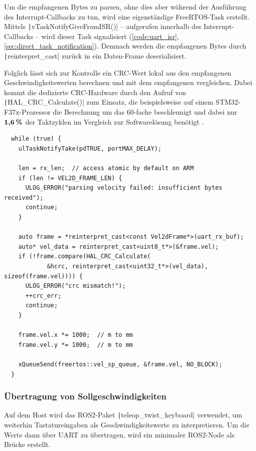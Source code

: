 Um die empfangenen Bytes zu parsen, ohne dies aber während der Ausführung des
Interrupt-Callbacks zu tun, wird eine eigenständige FreeRTOS-Task erstellt.
Mittels \texttt|vTaskNotifyGiveFromISR()| -- aufgerufen innerhalb des
Interrupt-Callbacks -- wird dieser Task signalisiert (\ref{code:uart_isr},
\ref{sec:direct_task_notification}). Demnach werden die empfangenen Bytes durch
\texttt|reinterpret_cast| zurück in ein Daten-Frame deserialisiert.

Folglich lässt sich zur Kontrolle ein CRC-Wert lokal aus den empfangenen
Geschwindigkeitswerten berechnen und mit dem empfangenen vergleichen. Dabei
kommt die dedizierte CRC-Hardware durch den Aufruf von
\texttt|HAL_CRC_Calculate()| zum Einsatz, die beispielsweise auf einem
STM32-F37x-Prozessor die Berechnung um das 60-fache beschleunigt und dabei nur
$\textbf{1,6\,\%}$ der Taktzyklen im Vergleich zur Softwarelösung benötigt
\cite[S. 9]{AN4187}.

\begin{code}
\begin{verbatim}
  while (true) {
    ulTaskNotifyTake(pdTRUE, portMAX_DELAY);

    len = rx_len;  // access atomic by default on ARM
    if (len != VEL2D_FRAME_LEN) {
      ULOG_ERROR("parsing velocity failed: insufficient bytes received");
      continue;
    }

    auto frame = *reinterpret_cast<const Vel2dFrame*>(uart_rx_buf);
    auto* vel_data = reinterpret_cast<uint8_t*>(&frame.vel);
    if (!frame.compare(HAL_CRC_Calculate(
            &hcrc, reinterpret_cast<uint32_t*>(vel_data), sizeof(frame.vel)))) {
      ULOG_ERROR("crc mismatch!");
      ++crc_err;
      continue;
    }

    frame.vel.x *= 1000;  // m to mm
    frame.vel.y *= 1000;  // m to mm

    xQueueSend(freertos::vel_sp_queue, &frame.vel, NO_BLOCK);
  }
\end{verbatim}
\end{code}

\subsubsection{Übertragung von Sollgeschwindigkeiten}

Auf dem Host wird das ROS2-Paket \texttt|teleop_twist_keyboard|
verwendet, um weiterhin Tastatureingaben als Geschwindigkeitswerte zu
interpretieren. Um die Werte dann über UART zu übertragen, wird ein minimaler
ROS2-Node als Brücke erstellt.

